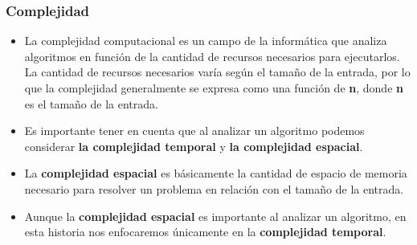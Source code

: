 \documentclass[xcolor=table]{beamer}
\begin{document}
\begin{frame}  \frametitle{Complejidad}\small

\begin{itemize}
    \item La complejidad computacional es un campo de la informática que analiza algoritmos en función de la cantidad de recursos necesarios para ejecutarlos. La cantidad de recursos necesarios varía según el tamaño de la entrada, por lo que la complejidad generalmente se expresa como una función de \textbf{n}, donde \textbf{n} es el tamaño de la entrada.

    \item Es importante tener en cuenta que al analizar un algoritmo podemos considerar\textbf{ la complejidad temporal} y \textbf{la complejidad espacial}. 

    \item La \textbf{complejidad espacial} es básicamente la cantidad de espacio de memoria necesario para resolver un problema en relación con el tamaño de la entrada. 

    \item Aunque la \textbf{complejidad espacial} es importante al analizar un algoritmo, en esta historia nos enfocaremos únicamente en la \textbf{complejidad temporal}.
\end{itemize}








\end{frame} 
\end{document}
